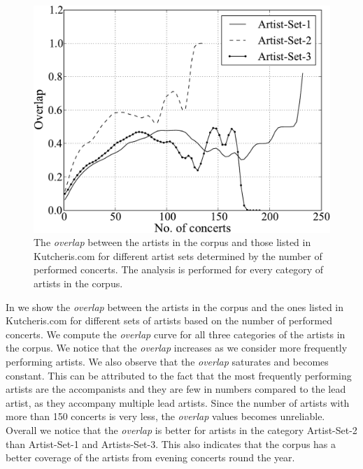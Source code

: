 \begin{figure}
	\begin{center}
		\includegraphics[width=\figSizeHundred]{ch04_datasets/figures/artist-coverage-vs-performances.pdf}
	\end{center}
	\caption{The \textit{overlap} between the artists in the corpus and those listed in Kutcheris.com for different artist sets determined by the number of performed concerts. The analysis is performed for every category of artists in the corpus.}
	\label{fig:artist_coverage_vs_number_of_concerts}
\end{figure}

In  we show the \textit{overlap} between the artists in the corpus and the ones listed in Kutcheris.com for different sets of artists based on the number of performed concerts. We compute the \textit{overlap} curve for all three categories of the artists in the corpus. We notice that the \textit{overlap} increases as we consider more frequently performing artists. We also observe that the \textit{overlap} saturates and becomes constant. This can be attributed to the fact that the most frequently performing artists are the accompanists and they are few in numbers compared to the lead artist, as they accompany multiple lead artists. Since the number of artists with more than 150 concerts is very less, the \textit{overlap}
values becomes unreliable. Overall we notice that the \textit{overlap} is better for artists in the category Artist-Set-2 than Artist-Set-1 and Artists-Set-3. This also indicates that the corpus has a better coverage of the artists from evening concerts round the year.


